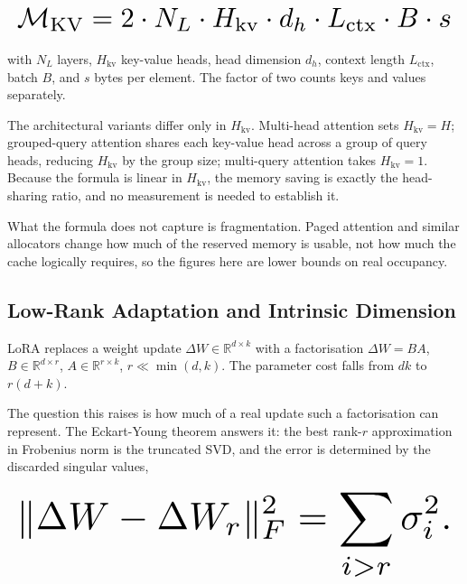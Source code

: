 \documentclass[10pt,twocolumn,letterpaper]{article}
\begin{document}
\begin{equation}
\resizebox{\columnwidth}{!}{$\displaystyle
\begin{aligned}
\mathcal{M}_{\text{KV}} = 2 \cdot N_L \cdot H_{\text{kv}} \cdot d_h \cdot L_{\text{ctx}} \cdot B \cdot s
\end{aligned}
$}
\end{equation}








with $N_L$ layers, $H_{\text{kv}}$ key-value heads, head dimension $d_h$, context length $L_{\text{ctx}}$, batch $B$, and $s$ bytes per element. The factor of two counts keys and values separately.

The architectural variants differ only in $H_{\text{kv}}$. Multi-head attention sets $H_{\text{kv}} = H$; grouped-query attention shares each key-value head across a group of query heads, reducing $H_{\text{kv}}$ by the group size; multi-query attention takes $H_{\text{kv}} = 1$. Because the formula is linear in $H_{\text{kv}}$, the memory saving is exactly the head-sharing ratio, and no measurement is needed to establish it.

What the formula does not capture is fragmentation. Paged attention and similar allocators change how much of the reserved memory is usable, not how much the cache logically requires, so the figures here are lower bounds on real occupancy.


\subsection{Low-Rank Adaptation and Intrinsic Dimension}


LoRA replaces a weight update $\Delta W \in \mathbb{R}^{d \times k}$ with a factorisation $\Delta W = BA$, $B \in \mathbb{R}^{d \times r}$, $A \in \mathbb{R}^{r \times k}$, $r \ll \min(d, k)$. The parameter cost falls from $dk$ to $r(d + k)$.

The question this raises is how much of a real update such a factorisation can represent. The Eckart-Young theorem answers it: the best rank-$r$ approximation in Frobenius norm is the truncated SVD, and the error is determined by the discarded singular values,








\begin{equation}
\resizebox{\columnwidth}{!}{$\displaystyle
\begin{aligned}
\|\Delta W - \Delta W_r\|_F^2 = \sum_{i > r} \sigma_i^2 .
\end{aligned}
$}
\end{equation}
\end{document}
